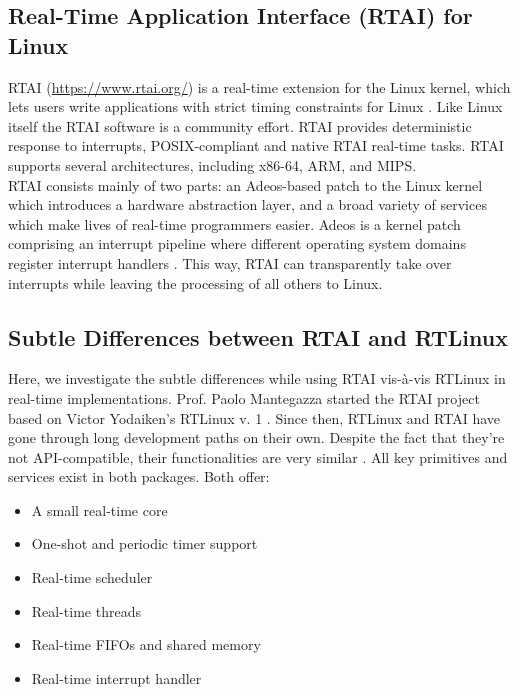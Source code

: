 \documentclass[12pt]{report}
\begin{document}
\subsection{Real-Time Application Interface (RTAI) for Linux}
RTAI (\url{https://www.rtai.org/}) is a real-time extension for the Linux kernel, which lets users write applications with strict timing constraints for Linux \cite{wiki-rtai} \cite{real-time-cap}. Like Linux itself the RTAI software is a community effort. RTAI provides deterministic response to interrupts, POSIX-compliant and native RTAI real-time tasks. RTAI supports several architectures, including x86-64, ARM, and MIPS.\\

RTAI consists mainly of two parts: an Adeos-based patch to the Linux kernel which introduces a hardware abstraction layer, and a broad variety of services which make lives of real-time programmers easier. Adeos is a kernel patch comprising an interrupt pipeline where different operating system domains register interrupt handlers  \cite{adeos}. This way, RTAI can transparently take over interrupts while leaving the processing of all others to Linux. \\

\subsection{Subtle Differences between RTAI and RTLinux}
Here, we investigate the subtle differences while using RTAI vis-\`a-vis RTLinux in real-time implementations. Prof. Paolo Mantegazza started the RTAI project based on Victor Yodaiken's RTLinux v. 1 \cite{embd-rtlinux}. Since then, RTLinux and RTAI have gone through long development paths on their own. Despite the fact that they're not API-compatible, their functionalities are very similar \cite{rtai-linux-journal}. All key primitives and services exist in both packages. Both offer:
\begin{itemize}
    \setlength\itemsep{-0.2em}
    \item A small real-time core
    \item One-shot and periodic timer support
    \item Real-time scheduler
    \item Real-time threads
    \item Real-time FIFOs and shared memory
    \item Real-time interrupt handler
\end{itemize}
\end{document}
